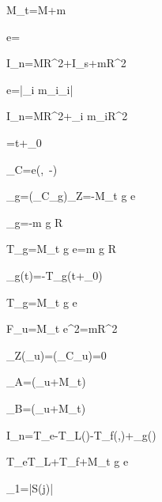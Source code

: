 %
%

M_t=M+m

e=

I_n=MR^2+I_s+mR^2

e=\left|\sum_i m_i_i\right|

I_n=MR^2+\sum_i m_iR^2

\theta=\omega t+\theta_0

_C=e\left(\sin\theta,\ -\cos\theta\right)

\tau_g=\left(_C\times{}_g\right)_Z=-M_t g e\sin\theta

\tau_g=-m g R\sin\theta

T_g=M_t g e=m g R

\tau_g\left(t\right)=-T_g\sin\left(\omega t+\theta_0\right)

T_g=M_t g e\cos\gamma

F_u=M_t e\omega^2=mR\omega^2

\tau_Z\left(_u\right)=\cdot\left(_C\times{}_u\right)=0

_A=\left(_u+M_t\right)

_B=\left(_u+M_t\right)

I_n\dot{\omega}=T_e-T_L\left(\theta\right)-T_f\left(\theta,\omega\right)+\tau_g\left(\theta\right)

T_e\approx T_L+T_f+M_t g e\sin\theta

\Delta\omega_1=\left|S\left(j\omega\right)\right|

